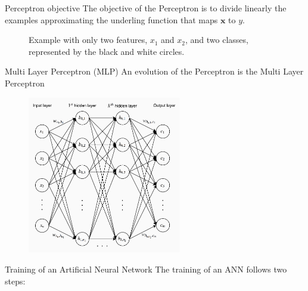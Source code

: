 \documentclass[xcolor={usenames}]{beamer}
\begin{document}
  \begin{frame}{Perceptron objective}
  	The objective of the Perceptron is to divide linearly the examples  approximating the underling function that maps \(\textbf{x}\) to \(y\).
  	\begin{figure}[t!]
		\centering
		\caption{Example with only two features, $x_1$ and $x_2$, and two classes, represented by the black and white circles.}
		
	\end{figure}
  \end{frame}
  \begin{frame}{Multi Layer Perceptron (MLP)}
  	An evolution of the Perceptron is the Multi Layer Perceptron
  	\begin{figure}[t]
		\centering
		\includegraphics[width=0.6\textwidth]{../figures/multi-layer-perceptron.png}
	\end{figure}	
  \end{frame}
  \begin{frame}{Training of an Artificial Neural Network}
  	The training of an ANN follows two steps:
  	\begin{itemize}
  	\end{itemize}
  \end{frame}
\end{document}

